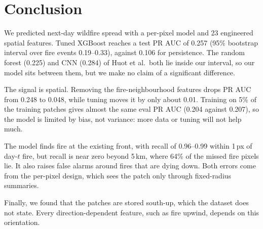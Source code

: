 
\section{Conclusion}
\label{sec:conclusion}

We predicted next-day wildfire spread with a per-pixel model and 23 engineered spatial features.
Tuned XGBoost reaches a test PR AUC of 0.257 (95\% bootstrap interval over fire events 0.19--0.33),
against 0.106 for persistence. The random forest (0.225) and CNN (0.284) of Huot et al.\ both lie
inside our interval, so our model sits between them, but we make no claim of a significant
difference.

The signal is spatial. Removing the fire-neighbourhood features drops PR AUC from 0.248 to 0.048,
while tuning moves it by only about 0.01. Training on 5\% of the training patches gives almost the
same eval PR AUC (0.204 against 0.207), so the model is limited by bias, not variance: more data
or tuning will not help much.

The model finds fire at the existing front, with recall of 0.96--0.99 within 1\,px of day-$t$ fire,
but recall is near zero beyond 5\,km, where 64\% of the missed fire pixels lie. It also raises
false alarms around fires that are dying down. Both errors come from the per-pixel design, which
sees the patch only through fixed-radius summaries.

Finally, we found that the patches are stored south-up, which the dataset does not state. Every
direction-dependent feature, such as fire upwind, depends on this orientation.

